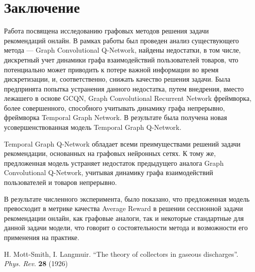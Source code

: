 \documentclass{mipt-thesis-ms}
\begin{document}
\chapter{Заключение}
Работа посвящена исследованию графовых методов решения задачи рекомендаций онлайн. В рамках работы был проведен анализ существующего метода --- Graph Convolutional Q-Network, найдены недостатки, в том числе, дискретный учет динамики графа взаимодействий пользователей товаров, что потенциально может приводить к потере важной информации во время дискретизации, и, соответственно, снижать качество решения задачи. Была предпринята попытка устранения данного недостатка, путем внедрения, вместо лежашего в основе GCQN, Graph Convolutional Recurrent Network фреймворка, более совершенного, способного учитывать динамику графа непрерывно, фреймворка Temporal Graph Network. В результате была получена новая усовершенствованная модель Temporal Graph Q-Network.

Temporal Graph Q-Network обладает всеми преимуществами решений задачи рекомендации, основанных на графовых нейронных сетях. К тому же, предложенная модель устраняет недостаток предыдущего аналога Graph Convolutional Q-Network, учитывая динамику графа взаимодействий пользователей и товаров непрерывно. 

В результате численного эксперимента, было показано, что предложенная модель превосходит в метрике качества Average Reward в решении сессионной задачи рекомендации онлайн, как графовые аналоги, так и некоторые стандартные для данной задачи модели, что говорит о состоятельности метода и возможности его применения на практике.


\backmatter

\begin{thebibliography}{99}
        H. Mott-Smith, I. Langmuir. ``The theory of collectors in gaseous discharges''. \emph{Phys. Rev.} \textbf{28} (1926)
\end{thebibliography}
\end{document}
